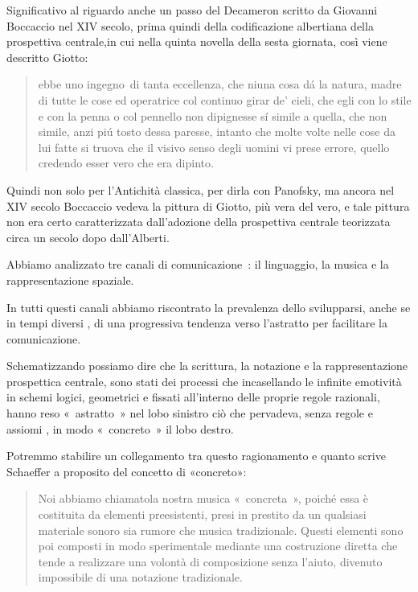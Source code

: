 Significativo al riguardo anche un passo del Decameron  scritto da Giovanni
Boccaccio nel XIV  secolo, prima quindi della codificazione albertiana della
prospettiva centrale,in cui nella quinta novella della sesta giornata, così
viene descritto Giotto:

\begin{quote}
ebbe uno ingegno di tanta eccellenza, che niuna cosa dá
la natura, madre di tutte le cose ed operatrice col continuo girar de’ cieli,
che egli con lo stile e con la penna o col pennello non dipignesse sí simile a
quella, che non simile, anzi piú tosto dessa paresse, intanto che molte volte
nelle cose da lui fatte si truova che il visivo senso degli uomini vi prese
errore, quello credendo esser vero che era dipinto.
\end{quote}

Quindi non solo per l’Antichità classica, per dirla con Panofsky, ma ancora nel
XIV secolo  Boccaccio vedeva la pittura di Giotto, più vera del vero, e tale
pittura non era certo caratterizzata dall’adozione della prospettiva centrale
teorizzata circa un secolo dopo dall’Alberti.

Abbiamo analizzato tre canali di comunicazione : il linguaggio, la musica e la
rappresentazione  spaziale.

In tutti questi canali abbiamo  riscontrato la prevalenza dello svilupparsi,
anche se in tempi diversi , di una progressiva tendenza verso l’astratto  per
facilitare la comunicazione.

Schematizzando possiamo dire che la scrittura, la notazione e la
rappresentazione prospettica centrale,  sono stati dei processi che
incasellando le infinite emotività  in schemi logici, geometrici e fissati
all’interno delle proprie regole razionali, hanno reso « astratto » nel lobo
sinistro  ciò che  pervadeva, senza regole  e assiomi , in modo « concreto »
il lobo destro.

Potremmo stabilire un collegamento tra questo ragionamento e  quanto scrive
Schaeffer  a proposito del concetto di «concreto»:

\begin{quote}
Noi abbiamo chiamatola nostra musica « concreta », poiché essa è costituita da elementi preesistenti, presi in prestito da un qualsiasi materiale sonoro sia rumore  che musica
tradizionale. Questi elementi sono poi composti in modo sperimentale mediante
una costruzione diretta  che tende a realizzare una volontà  di composizione
senza l’aiuto, divenuto impossibile di una notazione tradizionale.
\end{quote}

